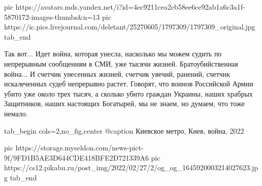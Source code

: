      pic https://avatars.mds.yandex.net/i?id=4ec9211cea2cb58ee6ce92ab1a6c3a1f-5870172-images-thumbs&n=13
		 pic https://ic.pics.livejournal.com/deletant/25270605/1797309/1797309_original.jpg
  tab_end
\fi

Так вот... Идет война, которая унесла, насколько мы можем судить по непрерывным
сообщениям в СМИ, уже тысячи жизней. Братоубийственная война... И счетчик
унесенных жизней, счетчик увечий, ранений, счетчик искалеченных судеб
непрерывно растет. Говорят, что воинов Российской Армии убито уже около трех
тысяч, а сколько убито граждан Украины, наших храбрых Защитников, наших
настоящих Богатырей, мы не знаем, но думаем, что тоже немало. 

\ifcmt
  tab_begin cols=2,no_fig,center
		 @caption Киевское метро, Киев, война, 2022

		 pic https://storage.myseldon.com/news-pict-9f/9FD1B5AE3D644CDE418BFE2D721339A6
     pic https://cs12.pikabu.ru/post_img/2022/02/27/2/og_og_1645920003214027623.jpg
  tab_end
\fi

